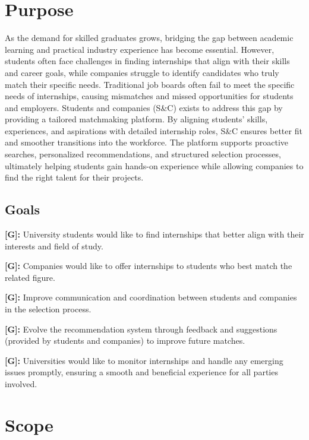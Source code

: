 \section{Purpose}
\label{sec:purpose}%

As the demand for skilled graduates grows, bridging the gap between academic learning and practical industry experience has become essential. However, students often face challenges in finding internships that align with their skills and career goals, while companies struggle to identify candidates who truly match their specific needs. Traditional job boards often fail to meet the specific needs of internships, causing mismatches and missed opportunities for students and employers.
Students and companies (S\&C) exists to address this gap by providing a tailored matchmaking platform. By aligning students’ skills, experiences, and aspirations with detailed internship roles, S\&C ensures better fit and smoother transitions into the workforce. The platform supports proactive searches, personalized recommendations, and structured selection processes, ultimately helping students gain hands-on experience while allowing companies to find the right talent for their projects.


\subsection{Goals}
\label{subsec:goals}%

\setcounter{g}{1}
\newcommand{\cg}{\theg{}}
\textbf{[G\cg]:} University students would like to find internships that better
align with their interests and field of study.

\textbf{[G\cg]:} Companies would like to offer internships to students who best
match the related figure.

\textbf{[G\cg]:} Improve communication and coordination between students and
companies in the selection process.

\textbf{[G\cg]:} Evolve the recommendation system through feedback and
suggestions (provided by students and companies) to improve future
matches.

\textbf{[G\cg]:} Universities would like to monitor internships and handle any
emerging issues promptly, ensuring a smooth and beneficial experience
for all parties involved.

\section{Scope}
\label{sec:scope}%

